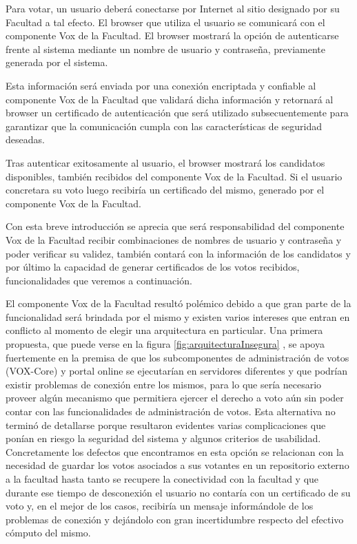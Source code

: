 Para votar, un usuario deberá conectarse por Internet al sitio designado por su Facultad a tal efecto. El browser que utiliza el usuario se comunicará con el componente Vox de la Facultad. El browser mostrará la opción de autenticarse frente al sistema mediante un nombre de usuario y contraseña, previamente generada por el sistema.

Esta información será enviada por una conexión encriptada y confiable al componente Vox de la Facultad que validará dicha información y retornará al browser un certificado de autenticación que será utilizado subsecuentemente para garantizar que la comunicación cumpla con las características de seguridad deseadas.

Tras autenticar exitosamente al usuario, el browser mostrará los candidatos disponibles, también recibidos del componente Vox de la Facultad. Si el usuario concretara su voto luego recibiría un certificado del mismo, generado por el componente Vox de la Facultad.

Con esta breve introducción se aprecia que será responsabilidad del componente Vox de la Facultad recibir combinaciones de nombres de usuario y contraseña y poder verificar su validez, también contará con la información de los candidatos y por último la capacidad de generar certificados de los votos recibidos, funcionalidades que veremos a continuación.


El componente Vox de la Facultad resultó polémico debido a que gran parte de la funcionalidad será brindada por el mismo y existen varios intereses que entran en conflicto al momento de elegir una arquitectura en particular. Una primera propuesta, que puede verse en la figura \ref{fig:arquitecturaInsegura}
, se apoya fuertemente en la premisa de que los subcomponentes de administración de votos (VOX-Core) y portal online se ejecutarían en servidores diferentes y que podrían existir problemas de conexión entre los mismos, para lo que sería necesario proveer algún mecanismo que permitiera ejercer el derecho a voto aún sin poder contar con las funcionalidades de administración de votos. Esta alternativa no terminó de detallarse porque resultaron evidentes varias complicaciones que ponían en riesgo la seguridad del sistema y algunos criterios de usabilidad. Concretamente los defectos que encontramos en esta opción se relacionan con la necesidad de guardar los votos asociados a sus votantes en un repositorio externo a la facultad hasta tanto se recupere la conectividad con la facultad y que durante ese tiempo de desconexión el usuario no contaría con un certificado de su voto y, en el mejor de los casos, recibiría un mensaje informándole de los problemas de conexión y dejándolo con gran incertidumbre respecto del efectivo cómputo del mismo.


